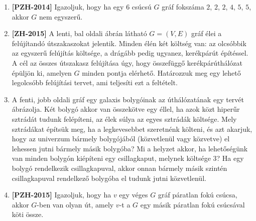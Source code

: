 \documentclass[a4paper,12pt]{article}
\begin{document}
\begin{enumerate}
        \item \textbf{[PZH-2014]} Igazoljuk, hogy ha egy $6$ csúcsú $G$ gráf fokszáma $2$, $2$, $2$, $4$, $5$, $5$, akkor $G$ nem egyszerű.

        
        \item \textbf{[ZH-2015]} A lenti, bal oldali ábrán látható $G = (V, E)$ gráf élei a felújítandó útszakaszokat jelentik. Minden élén két költség van: az olcsóbbik az egyszerű felújítás költsége, a drágább pedig ugyanez, kerékpárút építéssel. A cél az összes útszakasz felújítása úgy, hogy összefüggő kerékpárúthálózat épüljön ki, amelyen $G$ minden pontja elérhető. Határozzuk meg egy lehető legolcsóbb felújítási tervet, ami teljesíti ezt a feltételt.
        
        \begin{figure}[h]
            \centering
            \begin{subfigure}{0.45\textwidth}
                \centering
                 \hspace{1in}
            \end{subfigure}
            \begin{subfigure}{0.45\textwidth}
                \centering
                
            \end{subfigure}
        \end{figure}
        
        \item A fenti, jobb oldali gráf egy galaxis bolygóinak az úthálózatának egy tervét ábrázolja. Két bolygó akkor van összekötve egy éllel, ha azok közt hiperűr sztrádát tudunk felépíteni, az élek súlya az egyes sztrádák költsége. Mely sztrádákat építsük meg, ha a legkevesebbet szeretnénk költeni, és azt akarjuk, hogy az univerzum bármely bolygójából (közvetlenül vagy közvetve) el lehessen jutni bármely másik bolygóba? Mi a helyzet akkor, ha lehetőségünk van minden bolygón kiépíteni egy csillagkaput, melynek költsége $3$? Ha egy bolygó rendelkezik csillagkapuval, akkor onnan bármely másik szintén csillagkapuval rendelkező bolygóba el tudunk jutni közvetlenül.

        \item \textbf{[PZH-2015]} Igazoljuk, hogy ha $v$ egy véges $G$ gráf páratlan fokú csúcsa, akkor $G$-ben van olyan út, amely $v$-t a $G$ egy másik páratlan fokú csúcsával köti össze.



\end{enumerate}
\end{document}
